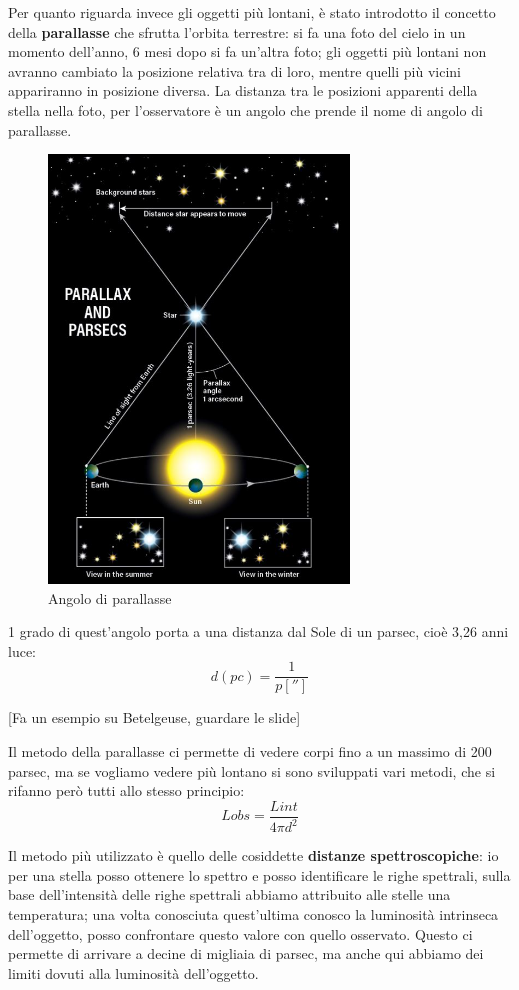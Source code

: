 \documentclass[a4paper,11pt]{article}
\begin{document}
Per quanto riguarda invece gli oggetti più lontani, è stato introdotto il concetto della \textbf{parallasse} che sfrutta l'orbita terrestre: si fa una foto del cielo in un momento dell'anno, 6 mesi dopo si fa un'altra foto; gli oggetti più lontani non avranno cambiato la  posizione relativa tra di loro, mentre quelli più vicini appariranno in posizione diversa. La distanza tra le posizioni apparenti della stella nella foto, per l'osservatore è un angolo che prende il nome di angolo di parallasse.
\begin{figure}[h!!]
        \centering
        \includegraphics[width=8cm]{Parallasse.JPG}
        \caption{Angolo di parallasse}
        \label{fig:Correnti parassite}
    \end{figure}

1 grado di quest'angolo porta a una distanza dal Sole di un parsec, cioè 3,26 anni luce: $$d(pc)=\frac{1}{p['']} $$

[Fa un esempio su Betelgeuse, guardare le slide]

Il metodo della parallasse ci permette di vedere corpi fino a un massimo di 200 parsec, ma se vogliamo vedere più lontano si sono sviluppati vari metodi, che si rifanno però tutti allo stesso principio: $$Lobs=\frac{Lint}{4\pi d^{2}} $$

Il metodo più utilizzato è quello delle cosiddette \textbf{distanze spettroscopiche}: io per una stella posso ottenere lo spettro e posso identificare le righe spettrali, sulla base dell'intensità delle righe spettrali abbiamo attribuito alle stelle una temperatura; una volta conosciuta quest'ultima conosco la luminosità intrinseca dell'oggetto, posso confrontare questo valore con quello osservato. Questo ci permette di arrivare a decine di migliaia di parsec, ma anche qui abbiamo dei limiti dovuti alla luminosità dell'oggetto.
\end{document}
